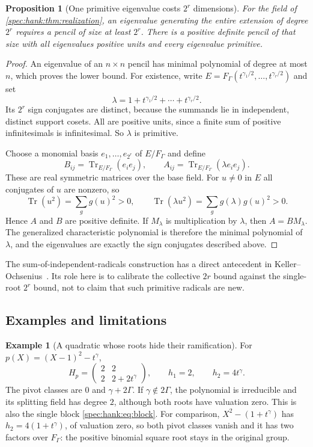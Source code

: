 \documentclass[11pt,a4paper]{article}
\numberwithin{equation}{section}
\newtheorem{proposition}[proposition]{Proposition}
\theoremstyle{definition}
\newtheorem{example}[example]{Example}
\theoremstyle{remark}
\newcommand{\Tr}{\operatorname{Tr}}
\begin{document}
\begin{proposition}[One primitive eigenvalue costs $2^r$ dimensions]
\label{spec:hank:prop:single}
For the field of \cref{spec:hank:thm:realization}, an eigenvalue generating
the entire extension of degree $2^r$ requires a pencil of size at least
$2^r$. There is a positive definite pencil of that size with all eigenvalues
positive units and every eigenvalue primitive.
\end{proposition}
\begin{proof}
An eigenvalue of an $n\times n$ pencil has minimal polynomial of degree at
most $n$, which proves the lower bound. For existence, write
$E=F_\Gamma(t^{\gamma_1/2},\ldots,t^{\gamma_r/2})$ and set
\[
 \lambda=1+t^{\gamma_1/2}+\cdots+t^{\gamma_r/2}.
\]
Its $2^r$ sign conjugates are distinct, because the summands lie in
independent, distinct support cosets. All are positive units, since a finite
sum of positive infinitesimals is infinitesimal. So $\lambda$ is primitive.

Choose a monomial basis $e_1,\ldots,e_{2^r}$ of $E/F_\Gamma$ and define
\[
 B_{ij}=\Tr_{E/F_\Gamma}(e_ie_j),\qquad
 A_{ij}=\Tr_{E/F_\Gamma}(\lambda e_ie_j).
\]
These are real symmetric matrices over the base field. For $u\ne0$ in $E$ all
conjugates of $u$ are nonzero, so
\[
 \Tr(u^2)=\sum_g g(u)^2>0,\qquad
 \Tr(\lambda u^2)=\sum_g g(\lambda)g(u)^2>0.
\]
Hence $A$ and $B$ are positive definite. If $M_\lambda$ is multiplication by
$\lambda$, then $A=BM_\lambda$. The generalized characteristic polynomial is
therefore the minimal polynomial of $\lambda$, and the eigenvalues are exactly
the sign conjugates described above.
\end{proof}

The sum-of-independent-radicals construction has a direct antecedent in
Keller--Ochsenius~\cite{KO08}. Its role here is to calibrate the collective
$2r$ bound against the single-root $2^r$ bound, not to claim that such
primitive radicals are new.

\subsection{Examples and limitations}
\label{spec:hank:sub:examples}

\begin{example}[A quadratic whose roots hide their ramification]\label{spec:hank:ex:quadratic}
For $p(X)=(X-1)^2-t^\gamma$,
\[
 H_p=\begin{pmatrix}2&2\\2&2+2t^\gamma\end{pmatrix},
 \qquad h_1=2,\qquad h_2=4t^\gamma.
\]
The pivot classes are $0$ and $\gamma+2\Gamma$. If $\gamma\notin2\Gamma$, the
polynomial is irreducible and its splitting field has degree $2$, although
both roots have valuation zero. This is also the single block
\eqref{spec:hank:eq:block}. For comparison, $X^2-(1+t^\gamma)$ has
$h_2=4(1+t^\gamma)$, of valuation zero, so both pivot classes vanish and it
has two factors over $F_\Gamma$: the positive binomial square root stays in
the original group.
\end{example}
\end{document}
